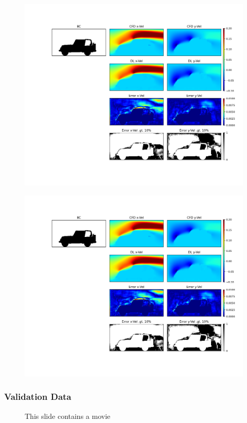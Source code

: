\documentclass{beamer}
\begin{document}
\begin{frame}
\begin{figure}[!htb]
\begin{minipage}{0.41\textwidth}
{        }
        \includegraphics[width=1.0\linewidth, trim = 11.5cm 3cm 3cm 2.1cm, clip]{../../../plots/plots/cars/errors/montage_test_pred_0.1_07.png}%
    \end{minipage}%
    \hspace{0.1cm}
    \begin{minipage}{0.1\textwidth}%
        \vspace{1.75cm}
        \includegraphics[width=0.49\linewidth, trim = 27.6cm 3cm 1cm 2.1cm, clip]{../../../plots/plots/cars/errors/montage_test_pred_0.1_07.png}%
    \end{minipage}%
\end{figure}
\end{frame}




\begin{frame}
\frametitle{Validation Data}
\begin{figure}[!htb]%
\caption{This slide contains a movie}
\end{figure}
\end{frame} 
\end{document}

